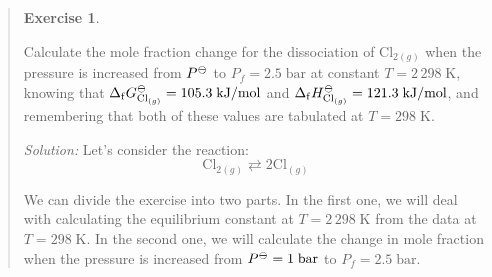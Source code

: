 \documentclass[
  9pt,
]{extbook}
\theoremstyle{definition}
\theoremstyle{definition}
\theoremstyle{definition}
\newtheorem{exercise}{Exercise}[chapter]
\theoremstyle{definition}
\theoremstyle{remark}
\begin{document}
\begin{quote}
\begin{exercise}
\protect\hypertarget{exr:kpkx}{}\label{exr:kpkx}

Calculate the mole fraction change for the dissociation of \(\mathrm{Cl}_{2(g)}\) when the pressure is increased from \(P^{-\kern-6pt{\ominus}\kern-6pt-}\) to \(P_f=2.5 \;\text{bar}\) at constant \(T=2\,298\;\mathrm{K}\), knowing that \(\Delta_{\mathrm{f}} G^{-\kern-6pt{\ominus}\kern-6pt-}_{\mathrm{Cl}_{(g)}} = 105.3 \;\text{kJ/mol}\) and \(\Delta_{\mathrm{f}} H^{-\kern-6pt{\ominus}\kern-6pt-}_{\mathrm{Cl}_{(g)}} = 121.3 \;\text{kJ/mol}\), and remembering that both of these values are tabulated at \(T=298\;\text{K}\).

\emph{Solution:} Let's consider the reaction:
\[
\mathrm{Cl}_{2(g)} \rightleftarrows 2 \mathrm{Cl}_{(g)}
\]

We can divide the exercise into two parts. In the first one, we will deal with calculating the equilibrium constant at \(T=2\,298\;\mathrm{K}\) from the data at \(T=298\;\mathrm{K}\). In the second one, we will calculate the change in mole fraction when the pressure is increased from \(P^{-\kern-6pt{\ominus}\kern-6pt-}=1\;\text{bar}\) to \(P_f=2.5 \;\text{bar}\).


\end{exercise}
\end{quote}
\end{document}
